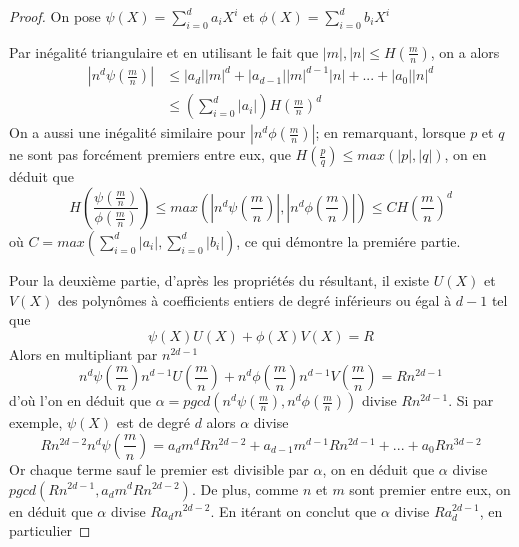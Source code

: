 \documentclass{article}
\begin{document}
\begin{proof}
On pose $\psi(X)=\sum_{i=0}^{d}{a_{i}X^i}$ et $\phi(X)=\sum_{i=0}^{d}{b_{i}X^i}$

Par inégalité triangulaire et en utilisant le fait que $|m|,|n| \leq H(\frac{m}{n})$, on a alors
\begin{align*}
|n^d\psi(\frac{m}{n})| &\leq |a_{d}||m|^d + |a_{d-1}||m|^{d-1}|n| + ... + |a_{0}||n|^d \\
					   &\leq (\sum_{i=0}^{d}{|a_{i}|})H(\frac{m}{n})^d
\end{align*}
On a aussi une inégalité similaire pour $|n^d\phi(\frac{m}{n})|$;
en remarquant, lorsque $p$ et $q$ ne sont pas forcément premiers entre eux,
que $H(\frac{p}{q}) \leq max(|p|, |q|)$, on en déduit que
\begin{equation*}
H(\frac{\psi(\frac{m}{n})}{\phi(\frac{m}{n})}) \leq max(|n^d\psi(\frac{m}{n})|, |n^d\phi(\frac{m}{n})|) 
	\leq C H(\frac{m}{n})^d
\end{equation*}
où $C=max(\sum_{i=0}^{d}{|a_{i}|},\sum_{i=0}^{d}{|b_{i}|})$, ce qui démontre la premiére partie.

Pour la deuxième partie, d'après les propriétés du résultant, il existe $U(X)$ et $V(X)$ des polynômes
à coefficients entiers de degré inférieurs ou égal à $d-1$ tel que
\begin{equation*}
\psi(X)U(X) + \phi(X)V(X) = R
\end{equation*}
Alors en multipliant par $n^{2d-1}$
\begin{equation}
\label{h1}
n^d\psi(\frac{m}{n})n^{d-1}U(\frac{m}{n}) + n^d\phi(\frac{m}{n})n^{d-1}V(\frac{m}{n}) = R n^{2d-1}
\end{equation}
d'où l'on en déduit que $\alpha=pgcd(n^d\psi(\frac{m}{n}), n^d\phi(\frac{m}{n}))$ divise $R n^{2d-1}$. Si par
exemple, $\psi(X)$ est de degré $d$ alors $\alpha$ divise
\begin{equation*}
Rn^{2d-2}n^d\psi(\frac{m}{n}) = a_{d}m^dRn^{2d-2} + a_{d-1}m^{d-1}Rn^{2d-1} + ... + a_{0}Rn^{3d-2}
\end{equation*}
Or chaque terme sauf le premier est divisible par $\alpha$, on en déduit que $\alpha$ divise 
$pgcd(Rn^{2d-1}, a_{d}m^{d}Rn^{2d-2})$. De plus, comme $n$ et $m$ sont premier entre eux, on en déduit
que $\alpha$ divise $Ra_{d}n^{2d-2}$. En itérant on conclut que $\alpha$ divise $Ra_{d}^{2d-1}$, en particulier


\end{proof}
\end{document}
